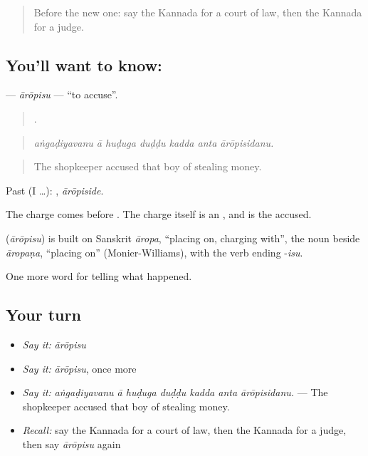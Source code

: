 \label{lesson:KA-C321-aropisu}



\begin{quote}
Before the new one: say the Kannada for a court of law, then the Kannada for a judge.
\end{quote}

\subsection*{You'll want to know: }
\textbf{} — \emph{ārōpisu} — \textquotedblleft{}to accuse\textquotedblright{}.

\begin{quote}
      .
\end{quote}

\begin{quote}
\emph{aṅgaḍiyavanu ā huḍuga duḍḍu kadda anta ārōpisidanu.}
\end{quote}

\begin{quote}
The shopkeeper accused that boy of stealing money.
\end{quote}

Past (I …): , \emph{ārōpiside}.

The charge comes before . The charge itself is an , and  is the accused.

\begin{cousinweb}
\textbf{} (\emph{ārōpisu}) is built on Sanskrit \emph{āropa}, \textquotedblleft{}placing on, charging with\textquotedblright{}, the noun beside \emph{āropaṇa}, \textquotedblleft{}placing on\textquotedblright{} (Monier-Williams), with the verb ending -\emph{isu}.
\end{cousinweb}

\begin{grammarlens}[title={What you've built}]
One more word for telling what happened.
\end{grammarlens}

\subsection*{Your turn}
\begin{itemize}
\raggedright
  \item \emph{Say it:} \emph{ārōpisu}
  \item \emph{Say it:} \emph{ārōpisu}, once more
  \item \emph{Say it:} \emph{aṅgaḍiyavanu ā huḍuga duḍḍu kadda anta ārōpisidanu.} — The shopkeeper accused that boy of stealing money.
  \item \emph{Recall:} say the Kannada for a court of law, then the Kannada for a judge, then say \emph{ārōpisu} again
\end{itemize}

